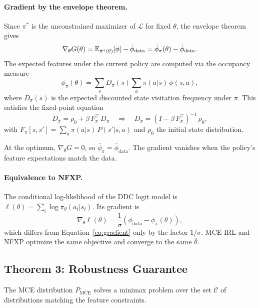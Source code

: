 \documentclass[10pt]{article}
\newcommand{\calL}{\mathcal{L}}
\newcommand{\calC}{\mathcal{C}}
\begin{document}
\paragraph{Gradient by the envelope theorem.}
Since $\pi^*$ is the unconstrained maximizer of $\calL$ for fixed $\theta$, the envelope theorem gives
\begin{equation}
\label{eq:gradient}
\nabla_\theta G(\theta) = \mathbb{E}_{\pi^*(\theta)}[\phi] - \bar\phi_{\text{data}} = \bar\phi_\pi(\theta) - \bar\phi_{\text{data}}.
\end{equation}
The expected features under the current policy are computed via the occupancy measure
\begin{equation}
\bar\phi_\pi(\theta) = \sum_{s} D_\pi(s) \sum_{a} \pi(a|s)\, \phi(s,a),
\end{equation}
where $D_\pi(s)$ is the expected discounted state visitation frequency under $\pi$. This satisfies the fixed-point equation
\begin{equation}
\label{eq:occupancy}
D_\pi = \rho_0 + \beta\, F_\pi^\top\, D_\pi \quad \Longrightarrow \quad D_\pi = (I - \beta\, F_\pi^\top)^{-1}\, \rho_0,
\end{equation}
with $F_\pi[s,s'] = \sum_a \pi(a|s)\, P(s'|s,a)$ and $\rho_0$ the initial state distribution.

At the optimum, $\nabla_\theta G = 0$, so $\bar\phi_\pi = \bar\phi_{\text{data}}$. The gradient vanishes when the policy's feature expectations match the data.

\paragraph{Equivalence to NFXP.}
The conditional log-likelihood of the DDC logit model is $\ell(\theta) = \sum_i \log \pi_\theta(a_i|s_i)$. Its gradient is
\begin{equation}
\nabla_\theta \ell(\theta) = \frac{1}{\sigma}\!\left(\bar\phi_{\text{data}} - \bar\phi_\pi(\theta)\right),
\end{equation}
which differs from Equation~\eqref{eq:gradient} only by the factor $1/\sigma$. MCE-IRL and NFXP optimize the same objective and converge to the same $\hat\theta$.


\subsection{Theorem 3: Robustness Guarantee}

The MCE distribution $P_{\text{MCE}}$ solves a minimax problem over the set $\calC$ of distributions matching the feature constraints.
\end{document}
